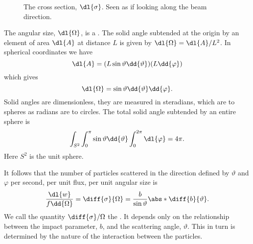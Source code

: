     \begin{figure}
        \caption{The cross section, \(\dl{\sigma}\). Seen as if looking along the beam direction.}
        \label{fig:d sigma}
    \end{figure}
    
    The angular size, \(\dl{\Omega}\), is a .
    The solid angle subtended at the origin by an element of area \(\dl{A}\) at distance \(L\) is given by \(\dl{\Omega} = \dl{A}/L^2\).
    In spherical coordinates we have
    \begin{equation}
        \dl{A} = (L\sin\vartheta \dd{\vartheta})(L\dd{\varphi})
    \end{equation}
    which gives
    \begin{equation}
        \dl{\Omega} = \sin\vartheta\dd{\vartheta}\dd{\varphi}.
    \end{equation}
    Solid angles are dimensionless, they are measured in steradians, which are to spheres as radians are to circles.
    The total solid angle subtended by an entire sphere is
    \begin{equation}
        \int_{S^2} \int_0^{\pi} \sin\vartheta\dd{\vartheta} \int_0^{2\pi} \dl{\varphi} = 4\pi.
    \end{equation}
    Here \(S^2\) is the unit sphere.
    
    It follows that the number of particles scattered in the direction defined by \(\vartheta\) and \(\varphi\) per second, per unit flux, per unit angular size is
    \begin{equation}
        \frac{\dl{w}}{f\dd{\Omega}} = \diff{\sigma}{\Omega} = \frac{b}{\sin\vartheta}\abs*{\diff{b}{\vartheta}}.
    \end{equation}
    We call the quantity \(\diff{\sigma}/{\Omega}\) the .
    It depends only on the relationship between the impact parameter, \(b\), and the scattering angle, \(\vartheta\).
    This in turn is determined by the nature of the interaction between the particles.
    
